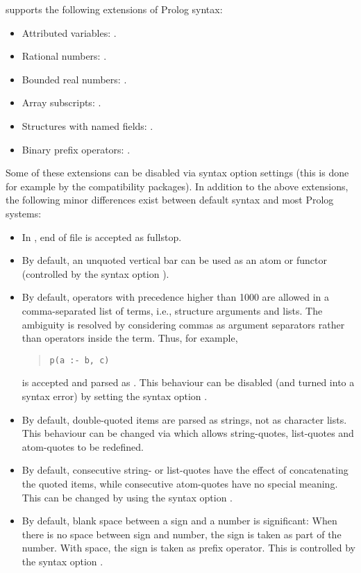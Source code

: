 {\eclipse} supports the following extensions of Prolog syntax:
\begin{itemize}
\item Attributed variables: .
\item Rational numbers: .
\item Bounded real numbers: .
\item Array subscripts: .
\item Structures with named fields: .
\item Binary prefix operators: .
\end{itemize}
Some of these extensions can be disabled via syntax option settings
(this is done for example by the compatibility packages).
In addition to the above extensions, the following minor differences
exist between default {\eclipse} syntax and most Prolog systems:
\begin{itemize}
\item In {\eclipse}, end of file is accepted as fullstop.

\item By default, an unquoted vertical bar can be used as an atom or
    functor (controlled by the syntax option ).

\item By default, operators with precedence higher than 1000 are allowed
    in a comma-separated list of terms, i.e., structure arguments
    and lists. The ambiguity is resolved by considering commas
    as argument separators rather than operators inside the term.
    Thus, for example,
\begin{quote}
\begin{verbatim}
p(a :- b, c)
\end{verbatim}
\end{quote}
    is accepted and parsed as . This behaviour can be disabled
    (and turned into a syntax error) by setting the syntax option
    .

\item By default, double-quoted items are parsed as strings, not as character
    lists.  This behaviour can be changed via
    which allows string-quotes, list-quotes and atom-quotes to be redefined.

\item By default, consecutive string- or list-quotes have the effect of
    concatenating the quoted items, while consecutive atom-quotes have
    no special meaning. This can be changed by using the syntax option
    .

\item By default, blank space between a sign and a number is significant:
    When there is no space between sign and number, the sign is taken as
    part of the number. With space, the sign is taken as prefix operator.
    This is controlled by the syntax option .
\end{itemize}


